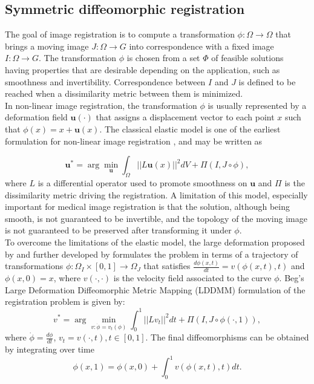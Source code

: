 \subsection{Symmetric diffeomorphic registration}

The goal of image registration is to compute a transformation $\phi: \Omega \rightarrow \Omega$ that brings a moving image $J:\Omega \rightarrow G$ into correspondence
with a fixed image $I:\Omega \rightarrow G$. The transformation $\phi$ is chosen from a set $\Phi$ of feasible solutions having properties that are desirable depending on the
application, such as smoothness and invertibility. Correspondence between $I$ and $J$ is defined to be reached when a dissimilarity metric between them is minimized.\\

In non-linear image registration, the transformation $\phi$ is usually represented by a deformation field $\mathbf{u(\cdot)}$ that assigns a displacement vector
to each point $x$ such that $\phi(x) = x + \mathbf{u}(x)$. The classical elastic model is one of the earliest formulation for non-linear image registration \citep{Bajcsy1982, Gee1999},
and may be written as

\begin{equation}\label{eq:elastic}
    \mathbf{u}^{*} = \arg \min_{\mathbf{u}} \int_{\Omega} ||L \mathbf{u}(x)||^{2}dV + \Pi(I, J \circ \phi),
\end{equation}
where $L$ is a differential operator used to promote smoothness on $\mathbf{u}$ and $\Pi$ is the dissimilarity metric driving the registration. A limitation of this model, especially important for medical image registration is that the solution, although being smooth, is not guaranteed to be invertible, and the topology of the moving image is not guaranteed to be preserved after transforming it under $\phi$.\\

To overcome the limitations of the elastic model, the large deformation proposed by \cite{Christensen2001} and further developed by \cite{Science2005} formulates the problem in terms of a trajectory of transformations \hbox{$\phi:\Omega_{I} \times [0, 1] \rightarrow \Omega_{J}$} that satisfies $\frac{d \phi(x, t)}{dt} = v(\phi(x, t), t)$ and $\phi(x, 0) = x$, where $v(\cdot, \cdot)$ is
the velocity field associated to the curve $\phi$. Beg's Large Deformation Diffeomorphic Metric Mapping (LDDMM) \citep{Science2005} formulation of the registration problem is given by:
\begin{equation}\label{eq:LDDMM}
    v^{*} = \arg \min_{v:\dot{\phi} = v_{t}(\phi)} \int_{0}^{1} ||L v_{t}||^{2} dt + \Pi(I, J \circ \phi(\cdot, 1)),
\end{equation}
where $\dot{\phi} = \frac{d\phi}{dt}$, $v_{t} = v(\cdot, t), t\in [0, 1]$. The final diffeomorphisms can be obtained by integrating over time
\begin{equation}\label{eq:velocity_integral}
    \phi(x, 1) = \phi(x, 0) + \int_{0}^{1}v(\phi(x, t), t) dt.
\end{equation}

